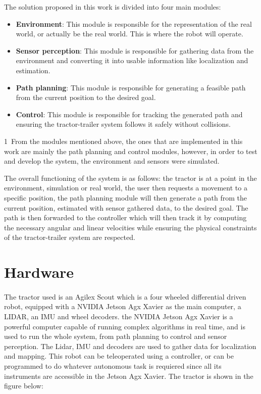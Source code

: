 The solution proposed in this work is divided into four main modules:
\begin{itemize}
    \item \textbf{Environment}: This module is responsible for the representation of the real world, or actually be the real world. This is where the robot will operate.
    \item \textbf{Sensor perception}: This module is responsible for gathering data from the environment and converting it into usable information like localization and estimation.
    \item \textbf{Path planning}: This module is responsible for generating a feasible path from the current position to the desired goal.
    \item \textbf{Control}: This module is responsible for tracking the generated path and ensuring the tractor-trailer system follows it safely without collisions.
\end{itemize}
1\
From the modules mentioned above, the ones that are implemented in this work are mainly 
the path planning and control modules, however, in order to test and develop the system, 
the environment and sensors were simulated.

The overall functioning of the system is as follows: the tractor is at a point in the environment, simulation or real world, 
the user then requests a movement to a specific position, the path planning module will then generate a path from the current 
position, estimated with sensor gathered data, to the desired goal. The path is then forwarded to the 
controller which will then track it by computing the necessary angular and linear velocities while ensuring the 
physical constraints of the tractor-trailer system are respected.
 


\section{Hardware}
\label{sec:hardware}

\paragraph{}The tractor used is an Agilex Scout which is a four wheeled differential driven robot, 
equipped with a NVIDIA Jetson Agx Xavier as the main computer, a LIDAR, an \gls{IMU} and wheel decoders. 
the NVIDIA Jetson Agx Xavier is a powerful computer capable of running complex algorithms in real time, 
and is used to run the whole system, from path planning to control and sensor 
perception. The Lidar, \gls{IMU} and decoders are used to gather data for localization and mapping. This 
robot can be teleoperated using a controller, or can be programmed 
to do whatever autonomous task is requiered since all its instruments 
are accessible in the Jetson Agx Xavier. The tractor is shown in the figure below:

